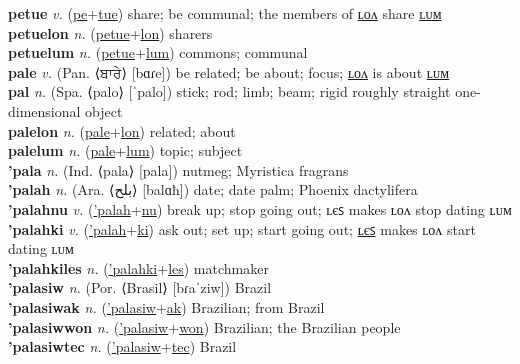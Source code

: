 \textbf{petue} \textit{v.} (\hyperref[pe]{pe}+\hyperref[tue]{tue})
share; be communal; the members of \hyperref[petuelon]{ʟᴏᴧ} share \hyperref[petuelum]{ʟᴜᴍ} \label{petue} \\
\textbf{petuelon} \textit{n.} (\hyperref[petue]{petue}+\hyperref[lon]{lon})
sharers \label{petuelon} \\
\textbf{petuelum} \textit{n.} (\hyperref[petue]{petue}+\hyperref[lum]{lum})
commons; communal \label{petuelum} \\
\textbf{pale} \textit{v.} (Pan. ⟨ਬਾਰੇ⟩ [bɑɾe])
be related; be about; focus; \hyperref[palelon]{ʟᴏᴧ} is about \hyperref[palelum]{ʟᴜᴍ} \label{pale} \\
\textbf{pal} \textit{n.} (Spa. ⟨palo⟩ [ˈpalo])
stick; rod; limb; beam; rigid roughly straight one-dimensional object \label{pal} \\
\textbf{palelon} \textit{n.} (\hyperref[pale]{pale}+\hyperref[lon]{lon})
related; about \label{palelon} \\
\textbf{palelum} \textit{n.} (\hyperref[pale]{pale}+\hyperref[lum]{lum})
topic; subject \label{palelum} \\
\textbf{'pala} \textit{n.} (Ind. ⟨pala⟩ [pala])
nutmeg; Myristica fragrans \label{'pala} \\
\textbf{'palah} \textit{n.} (Ara. ⟨بلح⟩ [balɑħ])
date; date palm; Phoenix dactylifera \label{'palah} \\
\textbf{'palahnu} \textit{v.} (\hyperref['palah]{'palah}+\hyperref[nu]{nu})
break up; stop going out; ʟєꜱ makes ʟᴏᴧ stop dating ʟᴜᴍ \label{'palahnu} \\
\textbf{'palahki} \textit{v.} (\hyperref['palah]{'palah}+\hyperref[ki]{ki})
ask out; set up; start going out; \hyperref['palahkiles]{ʟєꜱ} makes ʟᴏᴧ start dating ʟᴜᴍ \label{'palahki} \\
\textbf{'palahkiles} \textit{n.} (\hyperref['palahki]{'palahki}+\hyperref[les]{les})
matchmaker \label{'palahkiles} \\
\textbf{'palasiw} \textit{n.} (Por. ⟨Brasil⟩ [bɾaˈziw])
Brazil \label{'palasiw} \\
\textbf{'palasiwak} \textit{n.} (\hyperref['palasiw]{'palasiw}+\hyperref[ak]{ak})
Brazilian; from Brazil \label{'palasiwak} \\
\textbf{'palasiwwon} \textit{n.} (\hyperref['palasiw]{'palasiw}+\hyperref[won]{won})
Brazilian; the Brazilian people \label{'palasiwwon} \\
\textbf{'palasiwtec} \textit{n.} (\hyperref['palasiw]{'palasiw}+\hyperref[tec]{tec})
Brazil \label{'palasiwtec} \\
